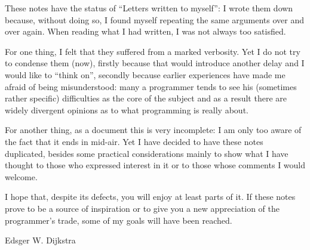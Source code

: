 
These notes have the status of ``Letters written to myself'': 
I wrote them down because, without doing so, I found myself 
repeating the same arguments over and over again.
When reading what I had written, I was not always too satisfied.

For one thing, I felt that they suffered from a marked verbosity.
Yet I do not try to condense them (now), firstly because that 
would introduce another delay and I would like to ``think on'', 
secondly because earlier experiences have made me afraid of being 
misunderstood: many a programmer tends to see his (sometimes rather
specific) difficulties as the core of the subject and as a
result there are widely divergent opinions as to what programming 
is really about.

For another thing, as a document this is very incomplete: I am 
only too aware of the fact that it ends in mid-air. Yet I have
decided to have these notes duplicated, besides some practical
considerations mainly to show what I have thought to those who
expressed interest in it or to those whose comments I would
welcome.

I hope that, despite its defects, you will enjoy at least parts
of it. If these notes prove to be a source of inspiration or to
give you a new appreciation of the programmer's trade, some of
my goals will have been reached.

\hfill Edsger W. Dijkstra